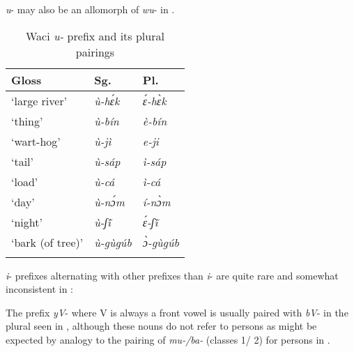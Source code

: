 \documentclass[output=paper]{langsci/langscibook}
\begin{document}
\textit{u}- may also be an allomorph of \textit{wu}- in .

\begin{table}
\caption{Waci \textit{u-} prefix and its plural pairings}
\label{extab:nomaffplat:24}
\begin{tabularx}{\textwidth}{XXl}
\lsptoprule 
Gloss 	&  {Sg.} 	&  {Pl.}\\
\midrule
‘large river’ 	&  \itshape ù-hɛ́k	 	&  \itshape ɛ́-hɛ̀k\\
‘thing’ 	&  \itshape ù-bín 	&  \itshape è-bín\\
‘wart-hog’ 	&  \itshape ù-jì 	&  \itshape e-ji\\
‘tail’ 	&  \itshape ù-sáp 	&  \itshape ì-sáp\\
‘load’ 	&  \itshape ù-cá 	&  \itshape ì-cá\\
‘day’ 	&  \itshape ù-nɔ́m	 	&  \itshape í-nɔ̀m\\
‘night’ 	&  \itshape ù-ʃ\'{ĩ} 	&  \textit{ɛ́-ʃĩ̀ } \\
‘bark (of tree)’ 	&  \itshape ù-gùgúb 	&  \itshape ɔ̀-gùgúb\\
 \lspbottomrule
\end{tabularx}
\end{table}


\textit{i}- prefixes alternating with other prefixes than \textit{i}- are quite rare and somewhat inconsistent in :


The  prefix \textit{yV}- where V is always a front vowel is usually paired with \textit{bV}- in the plural seen in , although these nouns do not refer to persons as might be expected by analogy to the pairing of \textit{mu-/ba-} (classes 1/ 2) for persons in .
\end{document}

